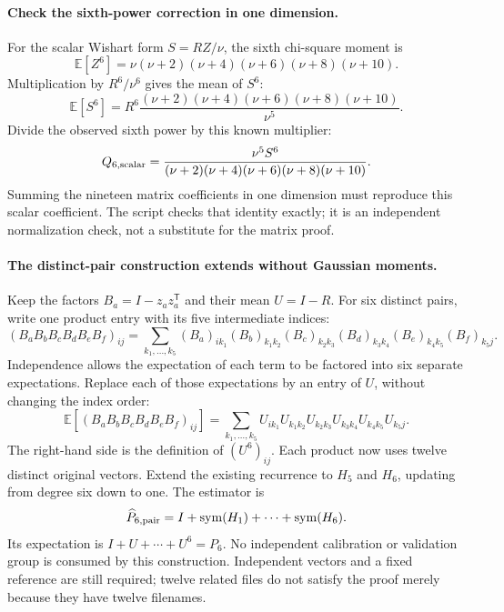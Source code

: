 \documentclass[11pt]{article}
\newcommand{\E}{\mathbb{E}}
\begin{document}
\paragraph{Check the sixth-power correction in one dimension.}
For the scalar Wishart form $S=RZ/\nu$, the sixth chi-square moment is
\begin{equation}
 \E[Z^6]=\nu(\nu+2)(\nu+4)(\nu+6)(\nu+8)(\nu+10).
\end{equation}
Multiplication by $R^6/\nu^6$ gives the mean of $S^6$:
\begin{equation}
 \E[S^6]=R^6\frac{(\nu+2)(\nu+4)(\nu+6)(\nu+8)(\nu+10)}{\nu^5}.
\end{equation}
Divide the observed sixth power by this known multiplier:
\begin{equation}
 Q_{6,\rm scalar}=
 \frac{\nu^5S^6}{(\nu+2)(\nu+4)(\nu+6)(\nu+8)(\nu+10)}.
\end{equation}
Summing the nineteen matrix coefficients in one dimension must reproduce
this scalar coefficient. The script checks that identity exactly; it is
an independent normalization check, not a substitute for the matrix proof.

\paragraph{The distinct-pair construction extends without Gaussian moments.}
Keep the factors $B_a=I-z_az_a^{\mathsf T}$ and their mean $U=I-R$.
For six distinct pairs, write one product entry with its five intermediate
indices:
\begin{equation}
 (B_aB_bB_cB_dB_eB_f)_{ij}
 =\sum_{k_1,\ldots,k_5}
 (B_a)_{ik_1}(B_b)_{k_1k_2}(B_c)_{k_2k_3}
 (B_d)_{k_3k_4}(B_e)_{k_4k_5}(B_f)_{k_5j}.
\end{equation}
Independence allows the expectation of each term to be factored into
six separate expectations. Replace each of those expectations by an
entry of $U$, without changing the index order:
\begin{equation}
 \E[(B_aB_bB_cB_dB_eB_f)_{ij}]
 =\sum_{k_1,\ldots,k_5}
 U_{ik_1}U_{k_1k_2}U_{k_2k_3}U_{k_3k_4}U_{k_4k_5}U_{k_5j}.
\end{equation}
The right-hand side is the definition of $(U^6)_{ij}$. Each product now
uses twelve distinct original vectors. Extend the existing recurrence to
$H_5$ and $H_6$, updating from degree six down to one. The estimator is
\begin{equation}
 \widehat P_{6,\rm pair}=I+
       \operatorname{sym}(H_1)+\cdots+\operatorname{sym}(H_6).
\end{equation}
Its expectation is $I+U+\cdots+U^6=P_6$. No independent calibration or
validation group is consumed by this construction. Independent vectors
and a fixed reference are still required; twelve related files do not
satisfy the proof merely because they have twelve filenames.
\end{document}
